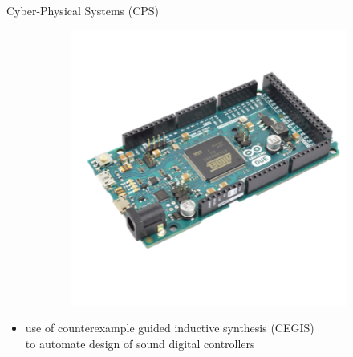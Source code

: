 \documentclass{beamer}
\begin{document}
\begin{frame}{Cyber-Physical Systems (CPS)}
\begin{figure}
\begin{subfigure}[b]{0.3\textwidth}
        \includegraphics[width=\textwidth]{figures/step1_figureA.png}
    \end{subfigure}
\end{figure}

\pause 

\begin{itemize}
\item 
use of counter\-example guided inductive synthesis (CEGIS)\\ 
to automate design of sound digital controllers 
\end{itemize} 

\end{frame}
\end{document}
